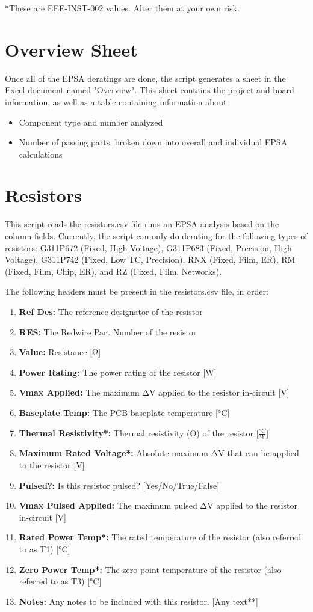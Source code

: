 \documentclass[12pt]{article}
\begin{document}
{\footnotesize
*These are EEE-INST-002 values. Alter them at your own risk.
}


\section{Overview Sheet}
Once all of the EPSA deratings are done, the script generates a sheet in the Excel document named "Overview". This sheet contains the project and board information, as well as a table containing information about:

\begin{itemize}
    \item Component type and number analyzed
    \item Number of passing parts, broken down into overall and individual EPSA calculations
\end{itemize}


\section{Resistors}
This script reads the resistors.csv file runs an EPSA analysis based on the column fields. Currently, the script can only do derating for the following types of resistors: G311P672 (Fixed, High Voltage), G311P683 (Fixed, Precision, High Voltage), G311P742 (Fixed, Low TC, Precision), RNX (Fixed, Film, ER), RM (Fixed, Film, Chip, ER), and RZ (Fixed, Film, Networks).

The following headers must be present in the resistors.csv file, in order:

\begin{enumerate}
    \item \textbf{Ref Des:} The reference designator of the resistor
    \item \textbf{RES:} The Redwire Part Number of the resistor
    \item \textbf{Value:} Resistance [Ω]
    \item \textbf{Power Rating:} The power rating of the resistor [W]
    \item \textbf{Vmax Applied:} The maximum ΔV applied to the resistor in-circuit [V]
    \item \textbf{Baseplate Temp:} The PCB baseplate temperature [°C]
    \item \textbf{Thermal Resistivity*:} Thermal resistivity (Θ) of the resistor [\(\frac{°C}{W}\)]
    \item \textbf{Maximum Rated Voltage*:} Absolute maximum ΔV that can be applied to the resistor [V]
    \item \textbf{Pulsed?:} Is this resistor pulsed? [Yes/No/True/False]
    \item \textbf{Vmax Pulsed Applied:} The maximum pulsed ΔV applied to the resistor in-circuit [V]
    \item \textbf{Rated Power Temp*:} The rated temperature of the resistor (also referred to as T1) [°C]
    \item \textbf{Zero Power Temp*:} The zero-point temperature of the resistor (also referred to as T3) [°C]
    \item \textbf{Notes:} Any notes to be included with this resistor. [Any text**]
\end{enumerate}
\end{document}
